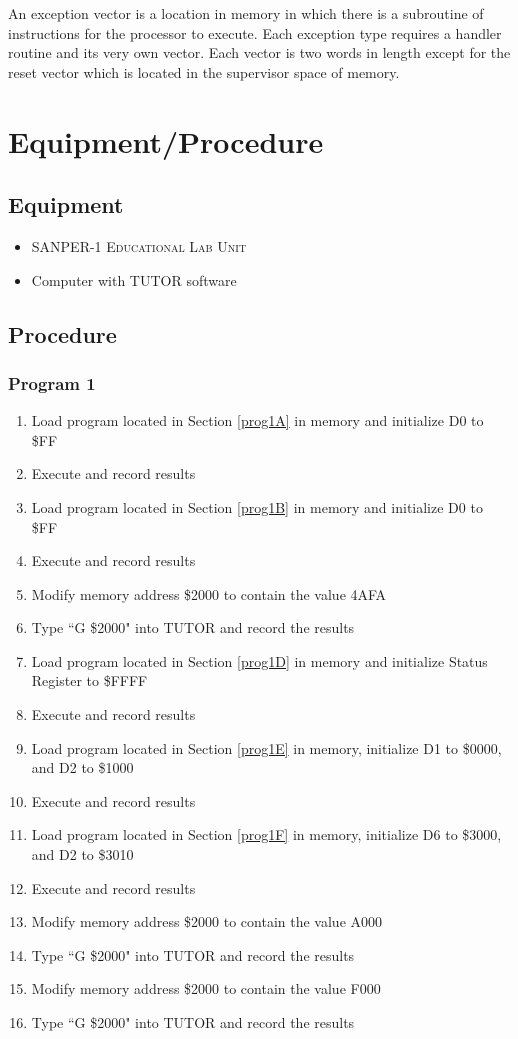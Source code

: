 \documentclass[12pt, twocolumn]{article}
\begin{document}
An exception vector is a location in memory in which there is a subroutine of instructions for the processor to execute. Each exception type requires a handler routine and its very own vector. Each vector is two words in length except for the reset vector which is located in the supervisor space of memory.
\section{Equipment/Procedure}
\subsection{Equipment}
\begin{itemize}
	\item \textsc{SANPER-1 Educational Lab Unit}
	\item Computer with TUTOR software
\end{itemize}
\subsection{Procedure}
\subsubsection{Program 1}
\begin{enumerate}
	\item Load program located in Section \ref{prog1A} in memory and initialize D0 to \$FF
	\item Execute and record results
	\item Load program located in Section \ref{prog1B} in memory and initialize D0 to \$FF
	\item Execute and record results
	\item Modify memory address \$2000 to contain the value 4AFA
	\item Type ``G \$2000" into TUTOR and record the results
	\item Load program located in Section \ref{prog1D} in memory and initialize Status Register to \$FFFF
	\item Execute and record results
	\item Load program located in Section \ref{prog1E} in memory, initialize D1 to \$0000, and D2 to \$1000 
	\item Execute and record results
	\item Load program located in Section \ref{prog1F} in memory, initialize D6 to \$3000, and D2 to \$3010 
	\item Execute and record results
	\item Modify memory address \$2000 to contain the value A000
	\item Type ``G \$2000" into TUTOR and record the results
	\item Modify memory address \$2000 to contain the value F000
	\item Type ``G \$2000" into TUTOR and record the results
\end{enumerate}
\end{document}
